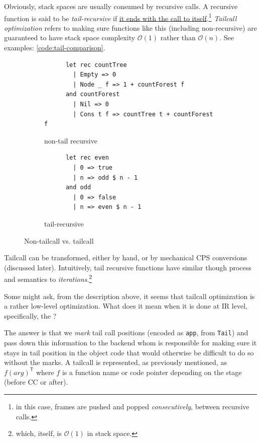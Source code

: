 \documentclass[a4paper, 11pt]{article}
\theoremstyle{remark}\newtheorem*{remark}{Remark}
\theoremstyle{definition}\newtheorem*{definition}{Definition}
\begin{document}
Obviously, stack spaces are usually consumed by recursive calls.
A recursive function is said to be \emph{tail-recursive} if \underline{it ends with the call to itself}.\footnote{
in this case, frames are pushed and popped \emph{consecutively}, between recursive calls.
}
\emph{Tailcall optimization} refers to making
sure functions like this (including non-recursive) are guaranteed to have stack space complexity $\mathcal{O}(1)$
rather than $\mathcal{O}(n)$. See examples: \autoref{code:tail-comparison}.
\begin{figure}
\centering
\begin{subfigure}{0.5\textwidth}\centering
    \begin{verbatim}
      let rec countTree
        | Empty => 0
        | Node _ f => 1 + countForest f
      and countForest
        | Nil => 0
        | Cons t f => countTree t + countForest f
    \end{verbatim}
  \caption{non-tail recursive}
\end{subfigure}%
\begin{subfigure}{0.5\textwidth}\centering
    \begin{verbatim}
      let rec even
        | 0 => true
        | n => odd $ n - 1
      and odd
        | 0 => false
        | n => even $ n - 1
    \end{verbatim}
  \caption{tail-recursive}
\end{subfigure}
\caption{Non-tailcall vs. tailcall}\label{code:tail-comparison}
\end{figure}

Tailcall can be transformed, either by hand, or by mechanical CPS conversions (discussed later).
Intuitively, tail recursive functions have similar though process and semantics to \emph{iterations}.\footnote{
which, itself, is $\mathcal{O}(1)$ in stack space.
}

Some might ask, from the description above, it seems that tailcall optimization is a rather low-level optimization.
What does it mean when it is done at IR level, specifically, the \Lambdair ?

The answer is that we \emph{mark} tail call positions (encoded as \texttt{app}, from \texttt{Tail}) and
pass down this information to the backend whom is responsible for making sure it stays in tail position
in the object code that would otherwise be difficult to do so without the marks. A tailcall is represented, as
previously mentioned, as $f(arg)^\mathsf{T}$ where $f$ is a function name or code pointer
depending on the stage (before CC or after).
\end{document}
